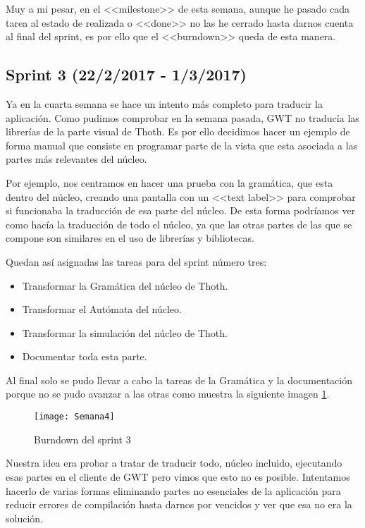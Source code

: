 Muy a mi pesar, en el <<milestone>> de esta semana, aunque he pasado cada tarea al estado de realizada o <<done>> no las he cerrado hasta darnos cuenta al final del sprint, es por ello que el <<burndown>> queda de esta manera.


\subsection{Sprint 3 (22/2/2017 - 1/3/2017)}

Ya en la cuarta semana se hace un intento más completo para traducir la aplicación. Como pudimos comprobar en la semana pasada, GWT no traducía las librerías de la parte visual de Thoth. Es por ello decidimos hacer un ejemplo de forma manual que consiste en programar parte de la vista que esta asociada a las partes más relevantes del núcleo.

Por ejemplo, nos centramos en hacer una prueba con la gramática, que esta dentro del núcleo, creando una pantalla con un <<text label>> para comprobar si funcionaba la traducción de esa parte del núcleo. De esta forma podríamos ver como hacía la traducción de todo el núcleo, ya que las otras partes de las que se compone son similares en el uso de librerías y bibliotecas.

Quedan así asignadas las tareas para del sprint número tres:

\begin{itemize}
\item Transformar la Gramática del núcleo de Thoth.
\item Transformar el Autómata del núcleo.
\item Transformar la simulación del núcleo de Thoth.
\item Documentar toda esta parte.
\end{itemize}

Al final solo se pudo llevar a cabo la tareas de la Gramática y la documentación porque no se pudo avanzar a las otras como muestra la siguiente imagen \ref{fig:A.2.6}.

\begin{figure}[h]
\centering
\texttt{[image: Semana4]}
\caption{Burndown del sprint 3}
\label{fig:A.2.6}
\end{figure}

 Nuestra idea era probar a tratar de traducir todo, núcleo incluido, ejecutando esas partes en el cliente de GWT  pero vimos que esto no es posible. Intentamos hacerlo de varias formas eliminando partes no esenciales de la aplicación para reducir errores de compilación hasta darnos por vencidos y ver que esa no era la solución.

